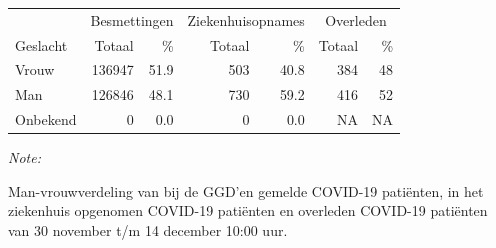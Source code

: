 \documentclass[
  english,
  man,floatsintext]{apa6}
\begin{document}
\newpage

\begin{table}
\centering\begingroup\fontsize{11}{13}\selectfont

\begin{threeparttable}
\begin{tabular}{lrrrrrr}
\toprule
\multicolumn{1}{c}{ } & \multicolumn{2}{c}{Besmettingen} & \multicolumn{2}{c}{Ziekenhuisopnames} & \multicolumn{2}{c}{Overleden} \\
\cmidrule(l{3pt}r{3pt}){2-3} \cmidrule(l{3pt}r{3pt}){4-5} \cmidrule(l{3pt}r{3pt}){6-7}
Geslacht & Totaal & \% & Totaal & \% & Totaal & \%\\
\midrule
Vrouw & 136947 & 51.9 & 503 & 40.8 & 384 & 48\\
Man & 126846 & 48.1 & 730 & 59.2 & 416 & 52\\
Onbekend & 0 & 0.0 & 0 & 0.0 & NA & NA\\
\bottomrule
\end{tabular}
\begin{tablenotes}
\item \textit{Note: } 
\item Man-vrouwverdeling van bij de GGD’en gemelde COVID-19 patiënten, in het ziekenhuis opgenomen COVID-19 patiënten en overleden COVID-19 patiënten van 30 november t/m 14 december 10:00 uur.
\end{tablenotes}
\end{threeparttable}
\endgroup{}
\end{table}
\newpage
\end{document}
